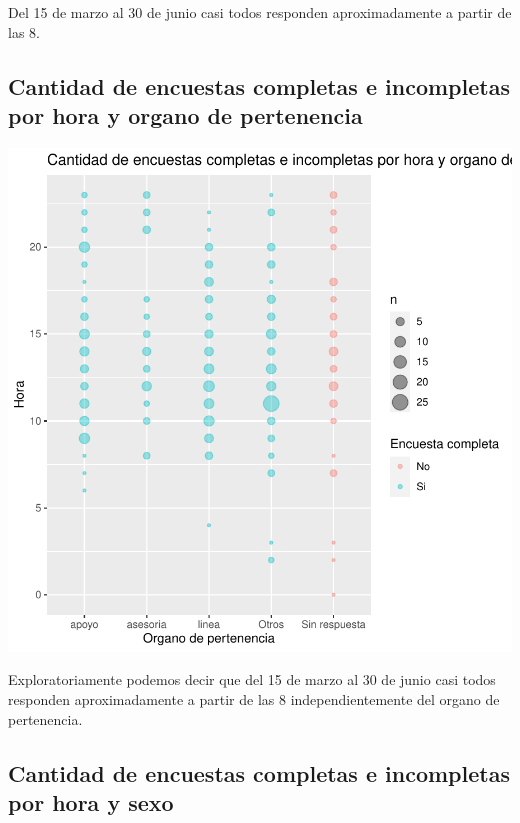 \documentclass{article}
\begin{document}
Del 15 de marzo al 30 de junio casi todos responden aproximadamente a partir de las 8.

\subsection{Cantidad de encuestas completas e incompletas por hora y organo de pertenencia}

\includegraphics{seguimientov3-073}

Exploratoriamente podemos decir que del 15 de marzo al 30 de junio casi todos responden aproximadamente a partir de las 8 independientemente del organo de pertenencia.

\subsection{Cantidad de encuestas completas e incompletas por hora y sexo}
\end{document}
